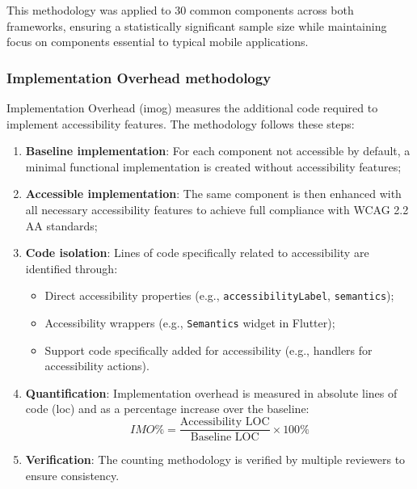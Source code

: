 This methodology was applied to 30 common components across both frameworks, ensuring a statistically significant sample size while maintaining focus on components essential to typical mobile applications.

\subsubsection{Implementation Overhead methodology}
\label{subsubsec:io-methodology}

Implementation Overhead (\gls{imog}) measures the additional code required to implement accessibility features. The methodology follows these steps:

\begin{enumerate}
    \item \textbf{Baseline implementation}: For each component not accessible by default, a minimal functional implementation is created without accessibility features;
    
    \item \textbf{Accessible implementation}: The same component is then enhanced with all necessary accessibility features to achieve full compliance with WCAG 2.2 AA standards;
    
    \item \textbf{Code isolation}: Lines of code specifically related to accessibility are identified through:
    \begin{itemize}
        \item Direct accessibility properties (e.g., \texttt{accessibilityLabel}, \texttt{semantics});
        \item Accessibility wrappers (e.g., \texttt{Semantics} widget in Flutter);
        \item Support code specifically added for accessibility (e.g., handlers for accessibility actions).
    \end{itemize}
    
    \item \textbf{Quantification}: Implementation overhead is measured in absolute lines of code (\acrshort{loc}) and as a percentage increase over the baseline:
    \begin{equation}
    IMO\% = \frac{\text{Accessibility LOC}}{\text{Baseline LOC}} \times 100\%
    \end{equation}
    
    \item \textbf{Verification}: The counting methodology is verified by multiple reviewers to ensure consistency.
\end{enumerate}

